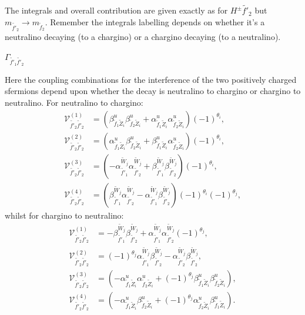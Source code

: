 \documentclass[final,3p,times,pdflatex]{elsarticle}
\begin{document}
The integrals and overall contribution are given exactly as for $H^{\pm} \tilde{f'}_2$ but $m_{\tilde{f'}_2} \rightarrow m_{\tilde{f}_2}$. Remember the integrals labelling depends on whether it's a neutralino decaying (to a chargino) or a chargino decaying (to a neutralino).

\textbf{\underline{$\Gamma_{\tilde{f'}_1 \tilde{f'}_2}$}}

Here the coupling combinations for the interference of the two positively charged sfermions depend upon whether the decay is neutralino to chargino or chargino to neutralino. For neutralino to chargino:
\begin{align}
\mathcal{V}_{\tilde{f'}_2 \tilde{f'}_2}^{(1)} &= (\beta_{\tilde{f}_1 \tilde{Z}_i}^{u} \beta_{\tilde{f}_2 \tilde{Z}_i}^{u} +  \alpha_{\tilde{f}_1 \tilde{Z}_i}^{u}\alpha_{\tilde{f}_2 \tilde{Z}_i}^{u})(-1)^{\theta_i}	, \\
\mathcal{V}_{\tilde{f'}_2 \tilde{f'}_2}^{(2)} &= (\alpha_{\tilde{f}_1 \tilde{Z}_i}^{u} \beta_{\tilde{f}_2 \tilde{Z}_i}^{u} +  \beta_{\tilde{f}_1 \tilde{Z}_i}^{u}\alpha_{\tilde{f}_2 \tilde{Z}_i}^{u})(-1)^{\theta_i}, \\
\mathcal{V}_{\tilde{f'}_2 \tilde{f'}_2}^{(3)} &= (-\alpha_{\tilde{f'}_1}^{\tilde{W}_j} \alpha_{\tilde{f'}_2}^{\tilde{W}_j} + \beta_{\tilde{f'}_1}^{\tilde{W}_j} \beta_{\tilde{f'}_2}^{\tilde{W}_j})(-1)^{\theta_i}, \\
\mathcal{V}_{\tilde{f'}_2 \tilde{f'}_2}^{(4)} &= (\beta_{\tilde{f'}_1}^{\tilde{W}_j}\alpha_{\tilde{f'}_2}^{\tilde{W}_j} - \alpha_{\tilde{f'}_1}^{\tilde{W}_j} \beta_{\tilde{f'}_2}^{\tilde{W}_j})(-1)^{\theta_i}(-1)^{\theta_j},
\end{align} 
whilst for chargino to neutralino:
\begin{align}
\mathcal{V}_{\tilde{f'}_2 \tilde{f'}_2}^{(1)} &= -\beta_{\tilde{f'}_1}^{\tilde{W}_j}\beta_{\tilde{f'}_2}^{\tilde{W}_j} + \alpha_{\tilde{f'}_1}^{\tilde{W}_j} \alpha_{\tilde{f'}_2}^{\tilde{W}_j}(-1)^{\theta_j}, \\
\mathcal{V}_{\tilde{f'}_2 \tilde{f'}_2}^{(2)} &= (-1)^{\theta_j} \alpha_{\tilde{f'}_1}^{\tilde{W}_j}\beta_{\tilde{f'}_2}^{\tilde{W}_j} - \alpha_{\tilde{f'}_2}^{\tilde{W}_j}\beta_{\tilde{f'}_2}^{\tilde{W}_j}, \\
\mathcal{V}_{\tilde{f'}_2 \tilde{f'}_2}^{(3)} &= (-\alpha_{\tilde{f}_1 \tilde{Z}_i}^{u}\alpha_{\tilde{f}_2 \tilde{Z}_i}^{u} + (-1)^{\theta_j}\beta_{\tilde{f}_1 \tilde{Z}_i}^{u} \beta_{\tilde{f}_2 \tilde{Z}_i}^{u}), \\
\mathcal{V}_{\tilde{f'}_2 \tilde{f'}_2}^{(4)} &= (-\alpha_{\tilde{f}_1 \tilde{Z}_i}^{u}\beta_{\tilde{f}_2 \tilde{Z}_i}^{u} + (-1)^{\theta_j}\alpha_{\tilde{f}_2 \tilde{Z}_i}^{u} \beta_{\tilde{f}_1 \tilde{Z}_i}^{u}).
\end{align}
\end{document}
